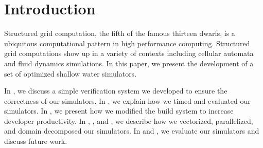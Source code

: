 \section{Introduction}\label{sec:intro}
Structured grid computation, the fifth of the famous thirteen dwarfs, is a
ubiquitous computational pattern in high performance computing. Structured grid
computations show up in a variety of contexts including cellular automata and
fluid dynamics simulations. In this paper, we present the development of a set
of optimized shallow water simulators.

In , we discuss a simple verification system we developed
to ensure the correctness of our simulators. In , we explain how
we timed and evaluated our simulators. In , we present how we
modified the build system to increase developer productivity. In
, , and , we
describe how we vectorized, parallelized, and domain decomposed our simulators.
In  and , we evaluate our simulators and
discuss future work.
